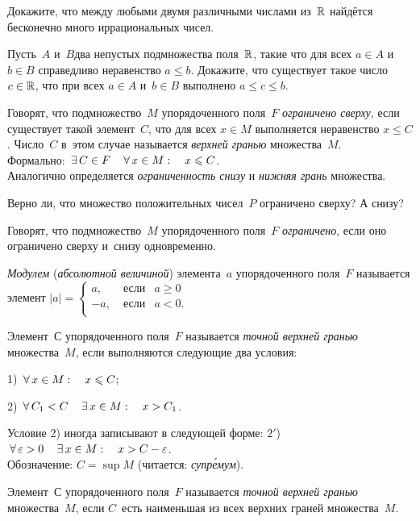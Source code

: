 \documentclass[a4paper,12pt]{article}
\begin{document}
Докажите, что между любыми двумя различными числами из~$\mathbb{R}$ найдётся бесконечно много иррациональных чисел.

Пусть~$A$ и~$B$\т два непустых подмножества поля~$\mathbb{R}$, такие что для всех $a\in A$ и~$b\in B$ справедливо неравенство $a\le b$. Докажите, что существует такое число $c\in\mathbb{R}$, что при всех $a\in A$ и~$b\in B$ выполнено $a\le c\le b$.

\newpage

Говорят, что подмножество~$M$ упорядоченного поля~$F$ \emph{ограничено сверху}, если существует такой элемент~$C$, что для всех $x\in M$ выполняется неравенство $x\le C$. Число~$C$ в~этом случае называется \emph{верхней гранью} множества~$M$.\\
Формально: $\,\exists\, C\in F \quad \,\forall\, x\in M:\quad x\leqslant C$.\\
Аналогично определяется \emph{ограниченность снизу} и \emph{нижняя грань} множества.

Верно ли, что множество положительных чисел~$P$ ограничено сверху? А снизу?

Говорят, что подмножество~$M$ упорядоченного поля~$F$ \emph{ограничено}, если оно ограничено сверху и~снизу одновременно.

\emph{Модулем} (\emph{абсолютной величиной}) элемента~$a$ упорядоченного поля~$F$ называется элемент
$
|a|=
\left\{
\begin{array}{rcl}
a,& \;\mbox{если}& a\ge0\\
-a,& \;\mbox{если}& a<0.\\
\end{array}
\right.
$

\label{sup-1}
Элемент~$С$ упорядоченного поля~$F$ называется \emph{точной верхней гранью} множества~$M$, если выполняются следующие два условия:
\begin{items}{-3}
\item[1)] $\,\forall\, x\in M:\quad x\leqslant C$;
\item[2)] $\,\forall\, C_1<C\quad \,\exists\, x\in M:\quad x>C_1$.
\end{items}
\vskip -2mm
Условие 2) иногда записывают в следующей форме:\quad
$2'$) $\,\forall\, \varepsilon>0 \quad \,\exists\, x\in M:\quad x>C-\varepsilon$.\\
Обозначение: $C=\sup M$ (читается: \emph{супр\'емум}).

\label{sup-2}
Элемент~$С$ упорядоченного поля~$F$ называется \emph{точной верхней гранью} множества~$M$, если $C$~есть наименьшая из всех верхних граней множества~$M$.
\end{document}
